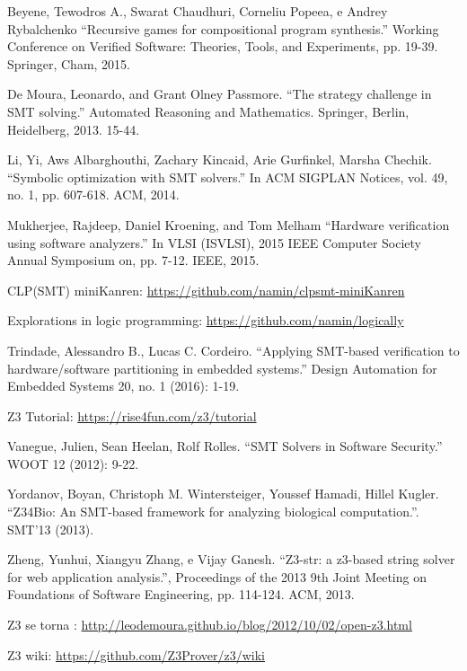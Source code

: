 \documentclass{article}
\begin{document}
\begin{thebibliography}{99}

 Beyene, Tewodros A., Swarat Chaudhuri, Corneliu
  Popeea, e Andrey Rybalchenko
  ``Recursive games for compositional program synthesis.''
  Working Conference on Verified Software: Theories, Tools, and
  Experiments, pp. 19-39. Springer, Cham, 2015.

 De Moura, Leonardo, and Grant Olney Passmore.
  ``The strategy challenge in SMT solving.''
  Automated Reasoning and Mathematics. Springer, Berlin, Heidelberg,
  2013. 15-44.
  
 Li, Yi, Aws Albarghouthi, Zachary Kincaid, Arie
  Gurfinkel,  Marsha Chechik.
  ``Symbolic optimization with SMT solvers.''
  In ACM SIGPLAN Notices, vol. 49, no. 1, pp. 607-618. ACM, 2014.

 Mukherjee, Rajdeep, Daniel Kroening, and Tom
  Melham
  ``Hardware verification using software analyzers.'' In VLSI
  (ISVLSI), 2015 IEEE Computer Society Annual Symposium on,
  pp. 7-12. IEEE, 2015.

 CLP(SMT) miniKanren:
  \url{https://github.com/namin/clpsmt-miniKanren}

 Explorations in logic programming:
  \url{https://github.com/namin/logically}
  
 Trindade, Alessandro B., Lucas C. Cordeiro.
  ``Applying SMT-based verification to hardware/software partitioning
  in embedded systems.''
  Design Automation for Embedded Systems 20, no. 1 (2016): 1-19.

 Z3 Tutorial: \url{https://rise4fun.com/z3/tutorial}
  
 Vanegue, Julien, Sean Heelan, Rolf Rolles.
  ``SMT Solvers in Software Security.'' WOOT 12 (2012): 9-22.
  
 Yordanov, Boyan, Christoph M. Wintersteiger,
  Youssef Hamadi, Hillel Kugler.
  ``Z34Bio: An SMT-based framework for analyzing biological
  computation.''. SMT’13 (2013).

 Zheng, Yunhui, Xiangyu Zhang, e Vijay Ganesh.
  ``Z3-str: a z3-based string solver for web application analysis.'',
  Proceedings of the 2013 9th Joint Meeting on Foundations of
  Software Engineering, pp. 114-124. ACM, 2013. 

 Z3 se torna :
  \url{http://leodemoura.github.io/blog/2012/10/02/open-z3.html}
  
 Z3 wiki: \url{https://github.com/Z3Prover/z3/wiki}
  
\end{thebibliography}
\end{document}
